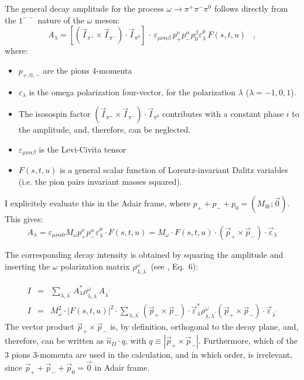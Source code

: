 \documentclass[a4paper,10pt]{report}
\begin{document}
The general decay amplitude for the process $\omega \rightarrow \pi^+ \pi^- \pi^0$ follows directly from the $1^{--}$ nature of the $\omega$ meson:
\begin{equation}
A_{\lambda}=[(\vec{I}_{\pi^+} \times \vec{I}_{\pi^-})\cdot \vec{I}_{\pi^0}] \, \cdot \, \varepsilon_{\mu \nu \alpha \beta}\, p^{\nu}_{+}p^{\alpha}_{-}p^{\beta}_{0}\varepsilon^{\mu}_{\lambda} \, F(s,t,u)  \; \; \; ,
\end{equation}
where:
\begin{itemize}
\item $p_{+,0,-}$ are the pions 4-momenta
\item $\varepsilon_{\lambda}$ is the omega polarization four-vector, for the polarization $\lambda$ ($\lambda=-1,0,1$).
\item The isosospin factor $(\vec{I}_{\pi^+} \times \vec{I}_{\pi^-})\cdot \vec{I}_{\pi^0}$ contributes with a constant phase $i$ to the amplitude, and, therefore, can be neglected.
\item $\varepsilon_{\mu \nu \alpha \beta}$ is the Levi-Civita tensor
\item $F(s,t,u)$ is a general scalar function of Lorentz-invariant Dalitz variables (i.e. the pion pairs invariant masses squared).
\end{itemize}

I explicitely evaluate this in the Adair frame, where $p_+ + p_- + p_0 = (M_W;\vec{0})$. This gives:
\begin{equation}
A_{\lambda}=\varepsilon_{\mu \nu \alpha 0} M_{\omega} p^{\nu}_{+}p^{\alpha}_{-}\varepsilon^{\mu}_{\lambda} \cdot F(s,t,u)
=
M_{\omega}\cdot F(s,t,u)\cdot (\vec{p}_{+}\times\vec{p}_{-})\cdot \vec{\varepsilon}_{\lambda}
\end{equation}

The corresponding decay intensity is obtained by squaring the amplitude and inserting the $\omega$ polarization matrix $\rho^\omega_{\lambda,\lambda^\prime}$ (see \cite{Schilling:1969um}, Eq.~6):

\begin{eqnarray}
I&=&\sum_{\lambda,\lambda^\prime} A^*_{\lambda} \rho^\omega_{\lambda,\lambda^\prime} A_{\lambda^\prime}\\
I&=&M^2_\omega \cdot |F(s,t,u)|^2 \cdot \sum_{\lambda,\lambda^\prime} (\vec{p}_{+}\times\vec{p}_{-})\cdot \vec{\varepsilon}^*_{\lambda} \rho^\omega_{\lambda,\lambda^\prime} (\vec{p}_{+}\times\vec{p}_{-})\cdot \vec{\varepsilon}_{\lambda^\prime}
\end{eqnarray}
The vector product $\vec{p}_{+}\times\vec{p}_{-}$ is, by definition, orthogonal to the decay plane, and, therefore, can be written as $\hat{n}_D \cdot q$, with $q\equiv | \vec{p}_{+}\times\vec{p}_{-} |$.
Furthermore, which of the 3 pions 3-momenta are used in the calculation, and in which order, is irrelevant, since $\vec{p}_{+}+\vec{p}_{-}+\vec{p}_{0}=\vec{0}$ in Adair frame.
\end{document}
